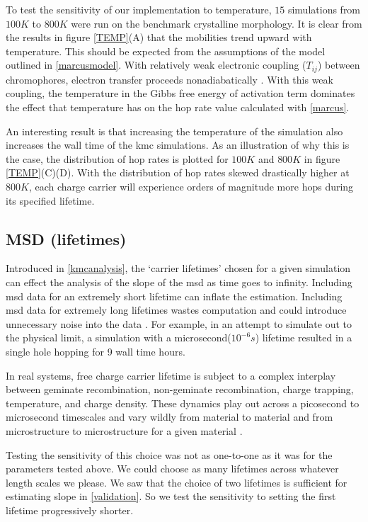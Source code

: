 To test the sensitivity of our implementation to
temperature, $15$  simulations from $100K$ to $800K$ were run on the benchmark  crystalline morphology. It is clear from the results in figure \ref{TEMP}(A) that the mobilities trend upward with temperature.
This should be expected from the assumptions of the model outlined in \autoref{marcusmodel}. 
With relatively weak electronic coupling ($T_{ij}$) between chromophores, electron transfer proceeds nonadiabatically \cite{clarke2010}. With this weak coupling, the temperature in the Gibbs free energy of activation term
dominates the effect that temperature has on the hop rate value calculated with \autoref{marcus}.

An interesting result is that increasing the temperature of the 
simulation also increases the wall time of the \gls{kmc} simulations.
As an illustration of why this is the case, the distribution of hop
rates is plotted for $100K$ and $800K$ in figure \ref{TEMP}(C)(D). With the distribution of hop rates skewed
drastically higher at $800K$, each charge carrier will experience orders of
magnitude more hops during its specified lifetime. 

\subsection{MSD (lifetimes)}

Introduced in \autoref{kmcanalysis}, the `carrier lifetimes' chosen for a given
simulation can effect the analysis of the slope of the \gls{msd} as time goes
to infinity. 
Including \gls{msd} data for an extremely short lifetime can inflate
the estimation. Including \gls{msd} data for extremely long lifetimes wastes computation and could introduce unnecessary noise into the data \cite{Maginn2018}. 
For example, in an attempt to simulate out to the physical limit, a
simulation with a microsecond($10^{-6}s$) lifetime resulted in a single hole hopping for 9 wall time hours.

In real systems, free charge
carrier lifetime is subject to a complex interplay between geminate recombination, non-geminate recombination,
charge trapping, temperature, and charge density. These dynamics play out across a picosecond to microsecond
timescales and vary wildly from material to material and from microstructure to microstructure for a
given material \cite{Laquai2015}.

Testing the sensitivity of this choice was not as one-to-one as it was for the
parameters tested above. We could choose as many lifetimes across whatever
length scales we please. We saw that the choice of two lifetimes is sufficient
for estimating slope in \autoref{validation}. So we test the sensitivity to
setting the first lifetime progressively shorter. 

